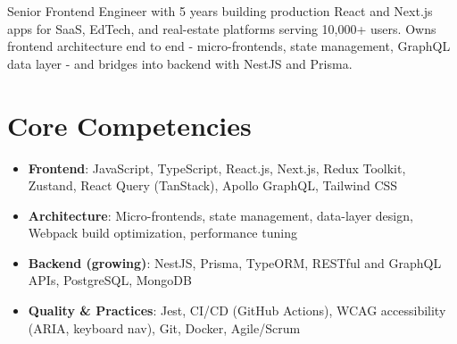 \documentclass[11pt,a4paper,sans]{moderncv}
\begin{document}
\makecvtitle


\vspace{2pt}
\small{Senior Frontend Engineer with 5 years building production React and Next.js apps for SaaS, EdTech, and real-estate platforms serving 10,000+ users. Owns frontend architecture end to end - micro-frontends, state management, GraphQL data layer - and bridges into backend with NestJS and Prisma.}


\section{Core Competencies}
\vspace{1pt}
\begin{itemize}

\item \textbf{Frontend}: JavaScript, TypeScript, React.js, Next.js, Redux Toolkit, Zustand, React Query (TanStack), Apollo GraphQL, Tailwind CSS

\item \textbf{Architecture}: Micro-frontends, state management, data-layer design, Webpack build optimization, performance tuning

\item \textbf{Backend (growing)}: NestJS, Prisma, TypeORM, RESTful and GraphQL APIs, PostgreSQL, MongoDB

\item \textbf{Quality \& Practices}: Jest, CI/CD (GitHub Actions), WCAG accessibility (ARIA, keyboard nav), Git, Docker, Agile/Scrum

\end{itemize}

\end{document}
